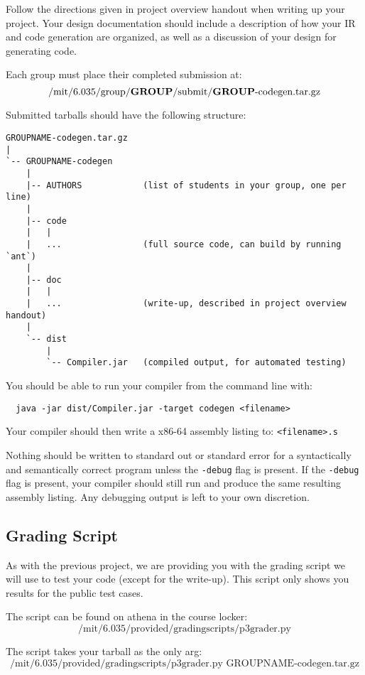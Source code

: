 Follow the directions given in project overview handout when writing up
your project.  Your design documentation should include a description of
how your IR and code generation are organized, as well as a discussion of
your design for generating code.

Each group must place their completed submission at:\[
\mbox{/mit/6.035/group/{\bf GROUP}/submit/{\bf GROUP}-codegen.tar.gz}
\]

Submitted tarballs should have the following structure:
{\scriptsize
\begin{verbatim}
GROUPNAME-codegen.tar.gz
|
`-- GROUPNAME-codegen
    |
    |-- AUTHORS            (list of students in your group, one per line)
    |
    |-- code
    |   |
    |   ...                (full source code, can build by running `ant`)
    |
    |-- doc 
    |   |
    |   ...                (write-up, described in project overview handout)
    |   
    `-- dist 
        |
        `-- Compiler.jar   (compiled output, for automated testing)
\end{verbatim}
}

You should be able to run your compiler from the command line with:
\begin{verbatim}
  java -jar dist/Compiler.jar -target codegen <filename>
\end{verbatim}
Your compiler should then write a x86-64 assembly listing to: {\tt <filename>.s}

Nothing should be written to standard out or standard error for a
syntactically and semantically correct program unless the {\tt -debug}
flag is present.  If the {\tt -debug} flag is present, your compiler
should still run and produce the same resulting assembly listing.  Any
debugging output is left to your own discretion.

\subsection*{Grading Script}

As with the previous project, we are providing you with the grading script
we will use to test your code (except for the write-up).  This script only
shows you results for the public test cases.

The script can be found on athena in the course locker: 
\[
\mbox{/mit/6.035/provided/gradingscripts/p3grader.py}
\]

The script takes your tarball as the only arg:
\[
\mbox{/mit/6.035/provided/gradingscripts/p3grader.py GROUPNAME-codegen.tar.gz}
\]

